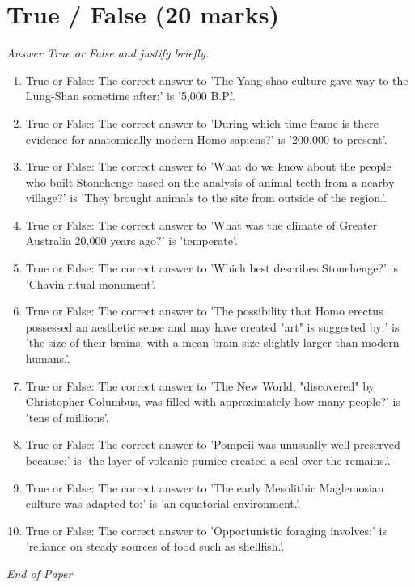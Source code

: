 \documentclass[12pt]{article}
\begin{document}
\section*{True / False (20 marks)}
\textit{Answer True or False and justify briefly.}
\begin{enumerate}[label=\arabic*.]
\item True or False: The correct answer to 'The Yang-shao culture gave way to the Lung-Shan sometime after:' is '5,000 B.P.'.
\item True or False: The correct answer to 'During which time frame is there evidence for anatomically modern Homo sapiens?' is '200,000 to present'.
\item True or False: The correct answer to 'What do we know about the people who built Stonehenge based on the analysis of animal teeth from a nearby village?' is 'They brought animals to the site from outside of the region.'.
\item True or False: The correct answer to 'What was the climate of Greater Australia 20,000 years ago?' is 'temperate'.
\item True or False: The correct answer to 'Which best describes Stonehenge?' is 'Chavin ritual monument'.
\item True or False: The correct answer to 'The possibility that Homo erectus possessed an aesthetic sense and may have created "art" is suggested by:' is 'the size of their brains, with a mean brain size slightly larger than modern humans.'.
\item True or False: The correct answer to 'The New World, "discovered" by Christopher Columbus, was filled with approximately how many people?' is 'tens of millions'.
\item True or False: The correct answer to 'Pompeii was unusually well preserved because:' is 'the layer of volcanic pumice created a seal over the remains.'.
\item True or False: The correct answer to 'The early Mesolithic Maglemosian culture was adapted to:' is 'an equatorial environment.'.
\item True or False: The correct answer to 'Opportunistic foraging involves:' is 'reliance on steady sources of food such as shellfish.'.
\end{enumerate}

\vfill
\noindent\textit{End of Paper}
\end{document}
